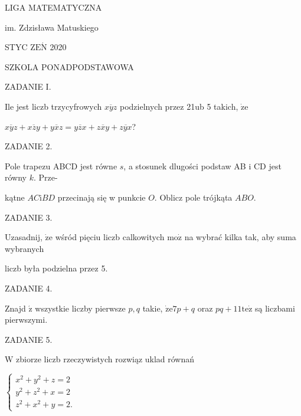 \documentclass[a4paper,12pt]{article}
\begin{document}
LIGA MATEMATYCZNA

im. Zdzisława Matuskiego

STYC Z$\mathrm{E}\acute{\mathrm{N}}$ 2020

SZKOLA PONADPODSTAWOWA

ZADANIE I.

Ile jest liczb trzycyfrowych $\overline{xyz}$ podzielnych przez 21ub 5 takich, $\dot{\mathrm{z}}\mathrm{e}$

$\overline{xyz}+\overline{xzy}+\overline{yxz}=\overline{yzx}+\overline{zxy}+\overline{zyx}$?

ZADANIE 2.

Pole trapezu ABCD jest równe $s$, a stosunek dlugości podstaw AB $\mathrm{i}$ CD jest równy $k$. Prze-

kątne $AC\mathrm{i}BD$ przecinają się w punkcie $O$. Oblicz pole trójkąta $ABO.$

ZADANIE 3.

Uzasadnij, $\dot{\mathrm{z}}\mathrm{e}$ wśród pięciu liczb calkowitych $\mathrm{m}\mathrm{o}\dot{\mathrm{z}}$ na wybrać kilka tak, aby suma wybranych

liczb była podzielna przez 5.

ZADANIE 4.

Znajd $\acute{\mathrm{z}}$ wszystkie liczby pierwsze $p, q$ takie, $\dot{\mathrm{z}}\mathrm{e}7p+q$ oraz $pq+11\mathrm{t}\mathrm{e}\dot{\mathrm{z}}$ są liczbami pierwszymi.

ZADANIE 5.

$\mathrm{W}$ zbiorze liczb rzeczywistych rozwiąz uklad równań

$\left\{\begin{array}{l}
x^{2}+y^{2}+z=2\\
y^{2}+z^{2}+x=2\\
z^{2}+x^{2}+y=2.
\end{array}\right.$
\end{document}
